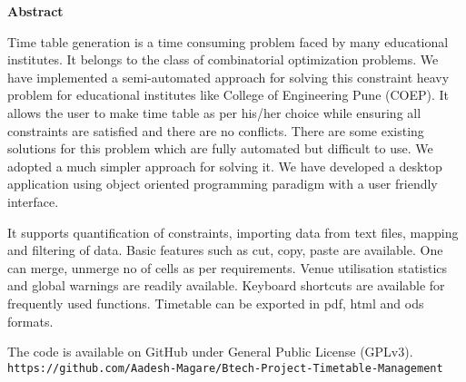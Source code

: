 \newpage
\begin{center}
\Large \textbf{Abstract}
\end{center}
Time table generation is a time consuming problem faced by many educational institutes. It belongs to the class of combinatorial optimization problems. We have implemented a semi-automated approach for solving this constraint heavy problem for educational institutes like College of Engineering Pune (COEP). It allows the user to make time table as per his/her choice while ensuring all constraints are satisfied and there are no conflicts. There are some existing solutions for this problem which are fully automated but difficult to use. We adopted a much simpler approach for solving it. We have developed a desktop application using object oriented programming paradigm with a user friendly interface. \par
It supports quantification of constraints, importing data from text files, mapping and filtering of data. Basic features such as cut, copy, paste are available. One can merge, unmerge no of cells as per requirements. Venue utilisation statistics and global warnings are readily available. Keyboard shortcuts are available for frequently used functions. Timetable can be exported in pdf, html and ods formats. \par
The code is available on GitHub under General Public License (GPLv3). 
\\\texttt{https://github.com/Aadesh-Magare/Btech-Project-Timetable-Management}

